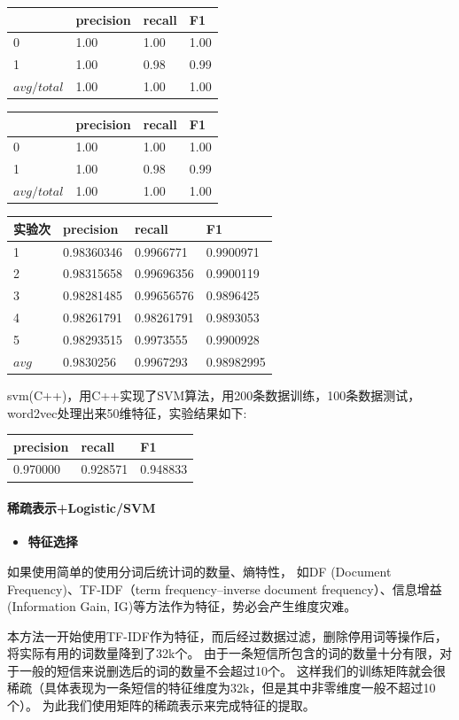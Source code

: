 \begin{longtable}[]{@{}llll@{}}
\toprule
& precision & recall & F1\tabularnewline
\midrule
\endhead
0 & 1.00 & 1.00 & 1.00\tabularnewline
1 & 1.00 & 0.98 & 0.99\tabularnewline
\(avg/total\) & 1.00 & 1.00 & 1.00\tabularnewline
\bottomrule
\end{longtable}

\begin{longtable}[]{@{}llll@{}}
\toprule
& precision & recall & F1\tabularnewline
\midrule
\endhead
0 & 1.00 & 1.00 & 1.00\tabularnewline
1 & 1.00 & 0.98 & 0.99\tabularnewline
\(avg/total\) & 1.00 & 1.00 & 1.00\tabularnewline
\bottomrule
\end{longtable}

\begin{longtable}[]{@{}llll@{}}
\toprule
实验次 & precision & recall & F1\tabularnewline
\midrule
\endhead
1 & 0.98360346 & 0.9966771 & 0.9900971\tabularnewline
2 & 0.98315658 & 0.99696356 & 0.9900119\tabularnewline
3 & 0.98281485 & 0.99656576 & 0.9896425\tabularnewline
4 & 0.98261791 & 0.98261791 & 0.9893053\tabularnewline
5 & 0.98293515 & 0.9973555 & 0.9900928\tabularnewline
\(avg\) & 0.9830256 & 0.9967293 & 0.98982995\tabularnewline
\bottomrule
\end{longtable}

svm(C++)，用C++实现了SVM算法，用200条数据训练，100条数据测试，word2vec处理出来50维特征，实验结果如下:

\begin{longtable}[]{@{}lll@{}}
\toprule
precision & recall & F1\tabularnewline
\midrule
\endhead
0.970000 & 0.928571 & 0.948833\tabularnewline
\bottomrule
\end{longtable}

\paragraph{稀疏表示+Logistic/SVM}\label{ux7a00ux758fux8868ux793alogisticsvm}

\begin{itemize}
\tightlist
\item
  \textbf{特征选择}
\end{itemize}

如果使用简单的使用分词后统计词的数量、熵特性， 如DF (Document
Frequency)、TF-IDF（term frequency--inverse document
frequency）、信息增益 (Information Gain,
IG)等方法作为特征，势必会产生维度灾难。

本方法一开始使用TF-IDF作为特征，而后经过数据过滤，删除停用词等操作后，将实际有用的词数量降到了32k个。
由于一条短信所包含的词的数量十分有限，对于一般的短信来说删选后的词的数量不会超过10个。
这样我们的训练矩阵就会很稀疏（具体表现为一条短信的特征维度为32k，但是其中非零维度一般不超过10个）。
为此我们使用矩阵的稀疏表示来完成特征的提取。

